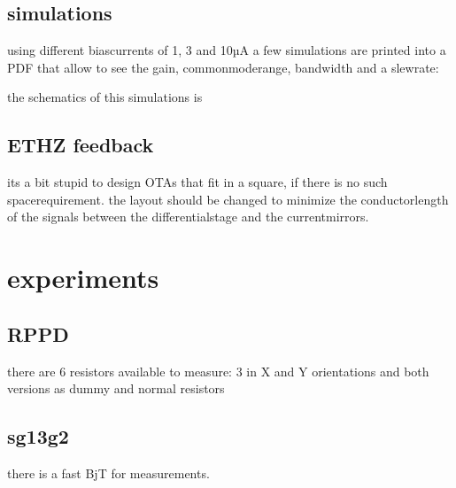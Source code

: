 \documentclass[letterpaper,10pt,english]{sphinxmanual}
\begin{document}
\sphinxAtStartPar



\section{simulations}
\label{\detokenize{ota:simulations}}
\sphinxAtStartPar
using different bias\sphinxhyphen{}currents of 1, 3 and 10µA a few simulations are printed into a PDF that allow to see the gain, common\sphinxhyphen{}mode\sphinxhyphen{}range, bandwidth and a slew\sphinxhyphen{}rate:

\sphinxAtStartPar
{}

\sphinxAtStartPar
the schematics of this simulations is 


\section{ETHZ feedback}
\label{\detokenize{ota:ethz-feedback}}
\sphinxAtStartPar
its a bit stupid to design OTAs that fit in a square, if there is no such space\sphinxhyphen{}requirement. the layout should be changed to minimize the conductor\sphinxhyphen{}length of the signals between the differential\sphinxhyphen{}stage and the current\sphinxhyphen{}mirrors.

\sphinxstepscope


\chapter{experiments}
\label{\detokenize{experiments:experiments}}\label{\detokenize{experiments::doc}}

\section{RPPD}
\label{\detokenize{experiments:rppd}}

\sphinxAtStartPar
there are 6 resistors available to measure:
3 in X and Y orientations
and both versions as dummy and normal resistors


\section{sg13g2}
\label{\detokenize{experiments:sg13g2}}
\sphinxAtStartPar
there is a fast BjT for measurements.
\end{document}
